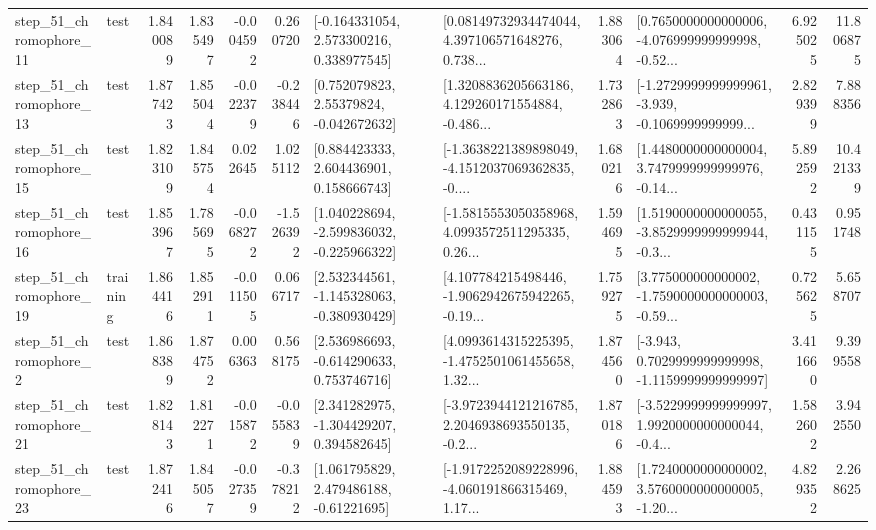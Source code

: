 \begin{tabular}{llrrrrllrlrr}
   step\_51\_chromophore\_11 &      test &      1.840089 &    1.835497 &     -0.004592 &  0.260720 &    [-0.164331054, 2.573300216, 0.338977545] &  [0.08149732934474044, 4.397106571648276, 0.738... &       1.883064 &  [0.7650000000000006, -4.076999999999998, -0.52... &            6.925025 &         11.806875 \\
   step\_51\_chromophore\_13 &      test &      1.877423 &    1.855044 &     -0.022379 & -0.238446 &     [0.752079823, 2.55379824, -0.042672632] &  [1.3208836205663186, 4.129260171554884, -0.486... &       1.732863 &  [-1.2729999999999961, -3.939, -0.1069999999999... &            2.829399 &          7.888356 \\
   step\_51\_chromophore\_15 &      test &      1.823109 &    1.845754 &      0.022645 &  1.025112 &     [0.884423333, 2.604436901, 0.158666743] &  [-1.3638221389898049, -4.1512037069362835, -0.... &       1.680216 &  [1.4480000000000004, 3.7479999999999976, -0.14... &            5.892592 &         10.421339 \\
   step\_51\_chromophore\_16 &      test &      1.853967 &    1.785695 &     -0.068272 & -1.526392 &   [1.040228694, -2.599836032, -0.225966322] &  [-1.5815553050358968, 4.0993572511295335, 0.26... &       1.594695 &  [1.5190000000000055, -3.8529999999999944, -0.3... &            0.431155 &          0.951748 \\
   step\_51\_chromophore\_19 &  training &      1.864416 &    1.852911 &     -0.011505 &  0.066717 &   [2.532344561, -1.145328063, -0.380930429] &  [4.107784215498446, -1.9062942675942265, -0.19... &       1.759275 &  [3.775000000000002, -1.7590000000000003, -0.59... &            0.725625 &          5.658707 \\
    step\_51\_chromophore\_2 &      test &      1.868389 &    1.874752 &      0.006363 &  0.568175 &    [2.536986693, -0.614290633, 0.753746716] &  [4.0993614315225395, -1.4752501061455658, 1.32... &       1.874560 &  [-3.943, 0.7029999999999998, -1.1159999999999997] &            3.411660 &          9.399558 \\
   step\_51\_chromophore\_21 &      test &      1.828143 &    1.812271 &     -0.015872 & -0.055839 &    [2.341282975, -1.304429207, 0.394582645] &  [-3.9723944121216785, 2.2046938693550135, -0.2... &       1.870186 &  [-3.5229999999999997, 1.9920000000000044, -0.4... &            1.582602 &          3.942550 \\
   step\_51\_chromophore\_23 &      test &      1.872416 &    1.845057 &     -0.027359 & -0.378212 &     [1.061795829, 2.479486188, -0.61221695] &  [-1.9172252089228996, -4.060191866315469, 1.17... &       1.884593 &  [1.7240000000000002, 3.5760000000000005, -1.20... &            4.829352 &          2.268625 \\

\end{tabular}
